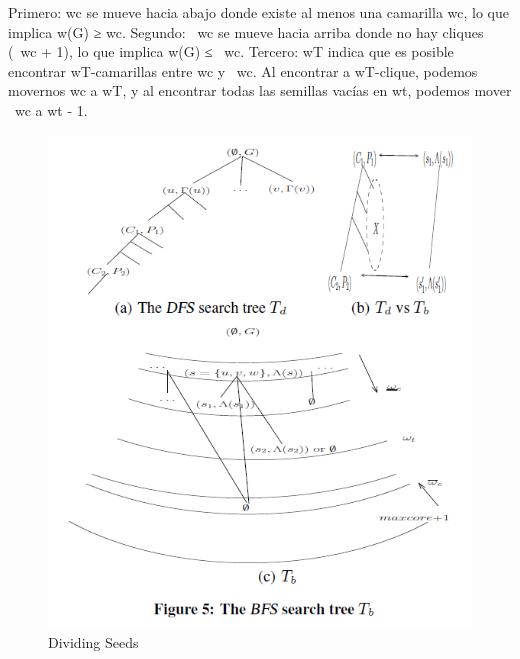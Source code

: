 Primero: wc se mueve hacia abajo donde existe al menos una camarilla wc, lo que implica w(G) ≥ wc. 
Segundo: ~wc se mueve hacia arriba donde no hay cliques (~wc + 1), lo que implica w(G) ≤ ~wc.
Tercero: wT indica que es posible encontrar wT-camarillas entre wc y ~wc. Al encontrar a wT-clique, podemos movernos wc a wT, y al encontrar todas las semillas vacías en wt, podemos mover ~wc a wt - 1. 
\\
\begin{figure}[h!]
\centering
\includegraphics[scale=1]{img/imagen9.png}
\caption{Dividing Seeds}
\label{Comandos}
\end{figure}
\\
